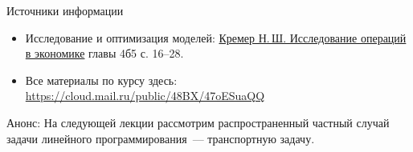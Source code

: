 \documentclass[unicode,11pt,notheorems]{beamer}
\begin{document}
\begin{frame}{Источники информации}
\begin{itemize}
\item 
	Исследование и оптимизация моделей:  {\color{blue}\href{https://cloud.mail.ru/public/4SN3/2MJYgEz95}{Кремер  Н.\,Ш. Исследование операций в экономике}} главы 4б5 с. 16--28.

\item 
	Все материалы по курсу здесь:
{\color{blue}\url{https://cloud.mail.ru/public/48BX/47oESuaQQ}}
\end{itemize}

\end{frame}

\begin{frame}{Анонс:}
	На следующей лекции рассмотрим распространенный частный случай задачи линейного программирования~--- транспортную задачу.
\end{frame}

\end{document}
